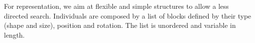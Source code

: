 \documentclass[sigconf]{acmart}
\begin{document}
For representation, we aim at flexible and simple structures to allow a less
directed search. %
Individuals are composed by a list of blocks 
defined by their type (shape and size), position and rotation.
The list is unordered and variable in length.
\end{document}
